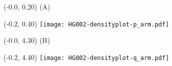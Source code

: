 \documentclass{article}
\begin{document}
\begin{textblock}{13}(-0.0,  0.20) \LARGE{(A)} \end{textblock}
\begin{textblock}{13}(-0.2,  0.40) \texttt{[image: HG002-densityplot-p\_arm.pdf]}   \end{textblock}

\begin{textblock}{13}(-0.0,  4.30) \LARGE{(B)} \end{textblock}
\begin{textblock}{13}(-0.2,  4.40) \texttt{[image: HG002-densityplot-q\_arm.pdf]}   \end{textblock}
\end{document}
